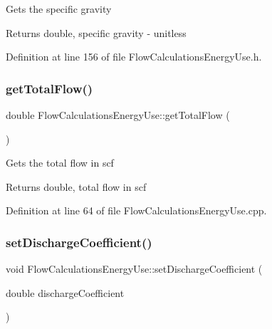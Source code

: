 Gets the specific gravity

\begin{DoxyReturn}{Returns}
double, specific gravity -\/ unitless 
\end{DoxyReturn}


Definition at line 156 of file Flow\+Calculations\+Energy\+Use.\+h.

\mbox{\label{class_flow_calculations_energy_use_a154ce8f8307b443366b99719987dd725}} 
\subsubsection{\texorpdfstring{get\+Total\+Flow()}{getTotalFlow()}}
{\footnotesize\ttfamily double Flow\+Calculations\+Energy\+Use\+::get\+Total\+Flow (\begin{DoxyParamCaption}{ }\end{DoxyParamCaption})}

Gets the total flow in scf

\begin{DoxyReturn}{Returns}
double, total flow in scf 
\end{DoxyReturn}


Definition at line 64 of file Flow\+Calculations\+Energy\+Use.\+cpp.

\mbox{\label{class_flow_calculations_energy_use_aaa0b642f4cb22b3b74acd8a5d473a107}} 
\subsubsection{\texorpdfstring{set\+Discharge\+Coefficient()}{setDischargeCoefficient()}}
{\footnotesize\ttfamily void Flow\+Calculations\+Energy\+Use\+::set\+Discharge\+Coefficient (\begin{DoxyParamCaption}\item[{double}]{discharge\+Coefficient }\end{DoxyParamCaption})\hspace{0.3cm}{\ttfamily [inline]}}

